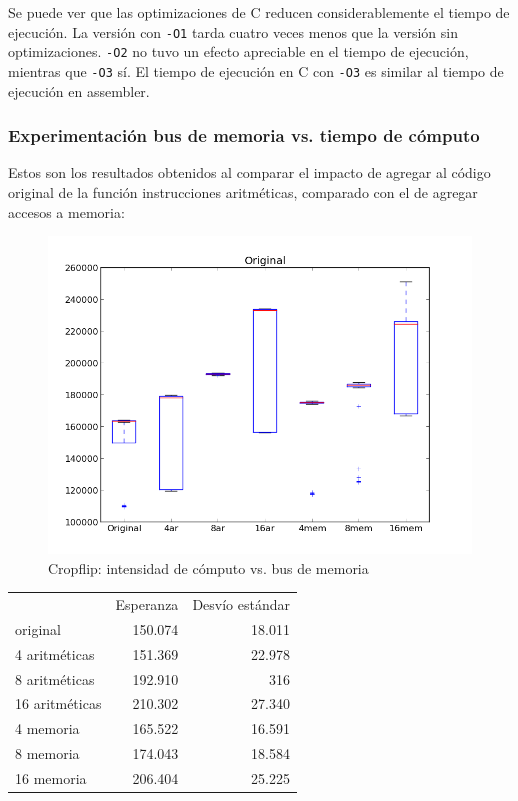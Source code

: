 \documentclass[a4paper]{article}
\begin{document}
\smallskip

Se puede ver que las optimizaciones de C reducen considerablemente el tiempo de ejecución. La versión con \texttt{-O1} tarda cuatro veces menos que la versión sin optimizaciones. \texttt{-O2} no tuvo un efecto apreciable en el tiempo de ejecución, mientras que \texttt{-O3} sí. El tiempo de ejecución en C con \texttt{-O3} es similar al tiempo de ejecución en assembler. 

\subsubsection{Experimentación bus de memoria vs. tiempo de cómputo}

Estos son los resultados obtenidos al comparar el impacto de agregar al código original de la función instrucciones aritméticas, comparado con el de agregar accesos a memoria:

\begin{figure}[htbp]
\centering
\includegraphics[scale=0.5]{imagenes/arvsmemcropflip.png}
\caption{Cropflip: intensidad de cómputo vs. bus de memoria}
\label{fig:graficos_cropflip2}
\end{figure}

\begin{tabular}{l|r|r} %
 & Esperanza & Desvío estándar \\
 original & 150.074 & 18.011 \\
 4 aritméticas & 151.369 & 22.978 \\
 8 aritméticas & 192.910 & 316 \\
 16 aritméticas & 210.302 & 27.340 \\
 4 memoria & 165.522 & 16.591 \\
 8 memoria & 174.043 & 18.584 \\
 16 memoria & 206.404 & 25.225
\end{tabular}
\end{document}
